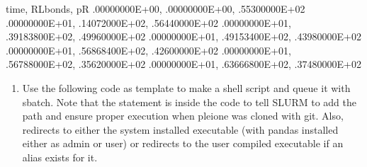 \documentclass[letterpaper,10pt,english]{sphinxmanual}
\begin{document}
%
\begin{sphinxVerbatim}[commandchars=\\\{\}]
time, RLbonds, pR
.00000000E+00, .00000000E+00, .55300000E+02
.00000000E+01, .14072000E+02, .56440000E+02
.00000000E+01, .39183800E+02, .49960000E+02
.00000000E+01, .49153400E+02, .43980000E+02
.00000000E+01, .56868400E+02, .42600000E+02
.00000000E+01, .56788000E+02, .35620000E+02
.00000000E+01, .63666800E+02, .37480000E+02
\end{sphinxVerbatim}
\begin{enumerate}
\def\theenumi{\arabic{enumi}}
\def\labelenumi{\theenumi .}
\makeatletter\def\p@enumii{\p@enumi \theenumi .}\makeatother
\setcounter{enumi}{1}
\item {} 

Use the following code as template to make a shell script and queue it with
sbatch. Note that the  statement is inside the code to tell SLURM
to add the path and ensure proper execution when pleione was cloned with
git. Also,  redirects to either the system installed executable
(with pandas installed either as admin or user) or redirects to the user
compiled executable if an alias exists for it.

\end{enumerate}
\end{document}
